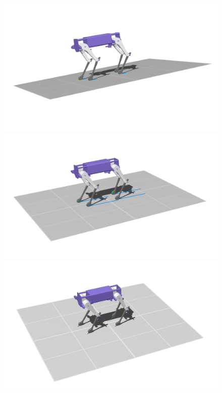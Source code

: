     \begin{figure}[h!]
    \centering
        \begin{minipage}{0.3\textwidth}
            \centering
            \includegraphics[width=\textwidth]{figures/lkgswing_1_crop.png} %
        \end{minipage}
        \begin{minipage}{0.3\textwidth}
            \centering
            \includegraphics[width=\textwidth]{figures/lkgswing_2_crop.png} %
        \end{minipage}
        \begin{minipage}{0.3\textwidth}
            \centering
            \includegraphics[width=\textwidth]{figures/lkgswing_3_crop.png} %
        \end{minipage}
        


\end{figure}
